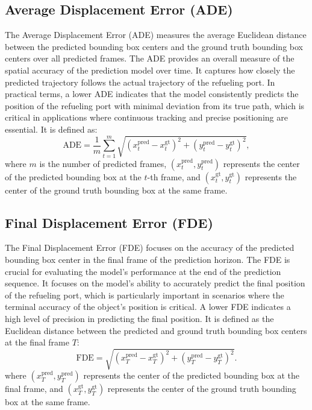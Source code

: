 \documentclass[12pt,oneside]{book} %
\begin{document}
\subsection*{Average Displacement Error (ADE)}
The Average Displacement Error (ADE) measures the average Euclidean distance
between the predicted bounding box centers and the ground truth bounding box
centers over all predicted frames. The ADE provides an overall measure of the
spatial accuracy of the prediction model over time. It captures how closely the
predicted trajectory follows the actual trajectory of the refueling port. In
practical terms, a lower ADE indicates that the model consistently predicts the
position of the refueling port with minimal deviation from its true path, which
is critical in applications where continuous tracking and precise positioning
are essential. It is defined as:
\begin{equation}
    \text{ADE} = \frac{1}{m} \sum_{t=1}^{m} \sqrt{(x_t^{\text{pred}} - x_t^{\text{gt}})^2 + (y_t^{\text{pred}} - y_t^{\text{gt}})^2},
\end{equation}
where \(m\) is the number of predicted frames, \((x_t^{\text{pred}}, y_t^{\text{pred}})\) represents the center of the predicted bounding box at the \(t\)-th frame, and \((x_t^{\text{gt}}, y_t^{\text{gt}})\) represents the center of the ground truth bounding box at the same frame.

\subsection*{Final Displacement Error (FDE)}
The Final Displacement Error (FDE) focuses on the accuracy of the predicted
bounding box center in the final frame of the prediction horizon. The FDE is
crucial for evaluating the model’s performance at the end of the prediction
sequence. It focuses on the model’s ability to accurately predict the final
position of the refueling port, which is particularly important in scenarios
where the terminal accuracy of the object’s position is critical. A lower FDE
indicates a high level of precision in predicting the final position. It is
defined as the Euclidean distance between the predicted and ground truth
bounding box centers at the final frame \(T\):
\begin{equation}
    \text{FDE} = \sqrt{(x_T^{\text{pred}} - x_T^{\text{gt}})^2 + (y_T^{\text{pred}} - y_T^{\text{gt}})^2}.
\end{equation}
where \((x_T^{\text{pred}}, y_T^{\text{pred}})\) represents the center of the predicted bounding box at the final frame, and \((x_T^{\text{gt}}, y_T^{\text{gt}})\) represents the center of the ground truth bounding box at the same frame.
\end{document}

